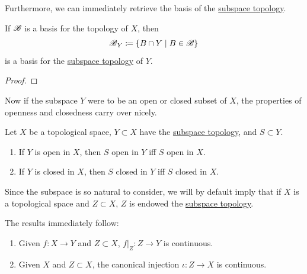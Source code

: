   Furthermore, we can immediately retrieve the basis of the \hyperref[def:subspace-topology]{subspace topology}. 

  \begin{theorem}
    \label{thm:induced-basis-of-subspace-topologies}
    If $\operatorname{\mathscr{B}}$ is a basis for the topology of $X$, then 
    \begin{equation}
      \operatorname{\mathscr{B}}_Y \coloneqq \{B \cap Y \mid B \in \operatorname{\mathscr{B}} \} 
    \end{equation}
    is a basis for the \hyperref[def:subspace-topology]{subspace topology} of $Y$. 
  \end{theorem}
  \begin{proof}
    
  \end{proof} 

  Now if the subspace $Y$ were to be an open or closed subset of $X$, the properties of openness and closedness carry over nicely. 

  \begin{lemma}
    \label{thm:open-closed-subspaces}
    Let $X$ be a topological space, $Y \subset X$ have the \hyperref[def:subspace-topology]{subspace topology}, and $S \subset Y$. 
    \begin{enumerate}
      \item If $Y$ is open in $X$, then $S$ open in $Y$ iff $S$ open in $X$. 
      \item If $Y$ is closed in $X$, then $S$ closed in $Y$ iff $S$ closed in $X$. 
    \end{enumerate}
  \end{lemma}

  Since the subspace is so natural to consider, we will by default imply that if $X$ is a topological space and $Z \subset X$, $Z$ is endowed the \hyperref[def:subspace-topology]{subspace topology}. 

  \begin{lemma}
    \label{thm:restrictions-and-injections-are-continuous}
    The results immediately follow: 
    \begin{enumerate}
      \item Given $f: X \rightarrow Y$ and $Z \subset X$, $f|_{Z} : Z \rightarrow Y$ is continuous. 
      \item Given $X$ and $Z \subset X$, the canonical injection $\iota: Z \rightarrow X$ is continuous. 
    \end{enumerate}
  \end{lemma}


